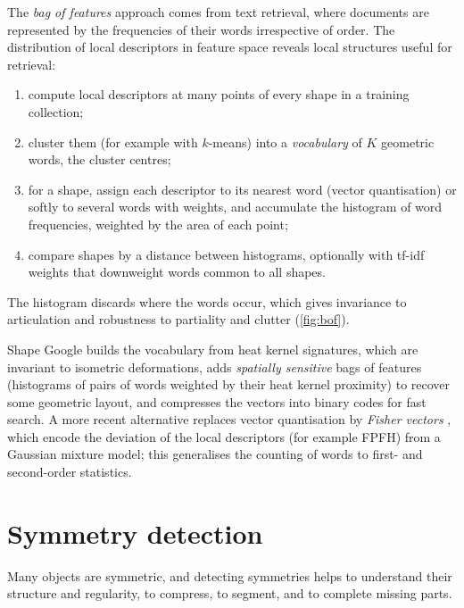 The \emph{bag of features} approach comes from text retrieval, where documents are represented by
the frequencies of their words irrespective of order. The distribution of local descriptors in feature
space reveals local structures useful for retrieval:
\begin{enumerate}
  \item compute local descriptors at many points of every shape in a training collection;
  \item cluster them (for example with $k$-means) into a \emph{vocabulary} of $K$ geometric words, the
  cluster centres;
  \item for a shape, assign each descriptor to its nearest word (vector quantisation) or softly to
  several words with weights, and accumulate the histogram of word frequencies, weighted by the area of
  each point;
  \item compare shapes by a distance between histograms, optionally with tf-idf weights that
  downweight words common to all shapes.
\end{enumerate}
The histogram discards where the words occur, which gives invariance to articulation and robustness
to partiality and clutter (\cref{fig:bof}).


Shape Google \citep{Bronstein2011} builds the vocabulary from heat kernel signatures, which are
invariant to isometric deformations, adds \emph{spatially sensitive} bags of features (histograms of
pairs of words weighted by their heat kernel proximity) to recover some geometric layout, and
compresses the vectors into binary codes for fast search. A more recent alternative replaces vector
quantisation by \emph{Fisher vectors} \citep{Perronnin2010}, which encode the deviation of the local
descriptors (for example FPFH) from a Gaussian mixture model; this generalises the counting of words
to first- and second-order statistics.

\section{Symmetry detection}

Many objects are symmetric, and detecting symmetries helps to understand their structure and
regularity, to compress, to segment, and to complete missing parts.

